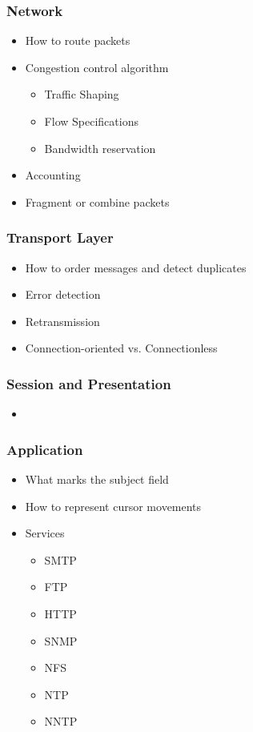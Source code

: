 \subsubsection{Network}\label{subsubsec:Network_Protocols}
\begin{itemize}[noitemsep]
\item How to route packets
\item Congestion control algorithm
  \begin{itemize}[noitemsep]
  \item Traffic Shaping
  \item Flow Specifications
  \item Bandwidth reservation
  \end{itemize}
\item Accounting
\item Fragment or combine packets
\end{itemize}

\subsubsection{Transport Layer}\label{subsubsec:Transport_Layer_Protocols}
\begin{itemize}[noitemsep]
\item How to order messages and detect duplicates
\item Error detection
\item Retransmission
\item Connection-oriented vs. Connectionless
\end{itemize}

\subsubsection{Session and Presentation}\label{subsubsec:Session_Presentation_Protocols}
\begin{itemize}[noitemsep]
\item
\end{itemize}

\subsubsection{Application}\label{subsubsec:Application_Protocols}
\begin{itemize}[noitemsep]
\item What marks the subject field
\item How to represent cursor movements
\item Services
  \begin{itemize}[noitemsep]
  \item SMTP
  \item FTP
  \item HTTP
  \item SNMP
  \item NFS
  \item NTP
  \item NNTP
  \end{itemize}
\end{itemize}

